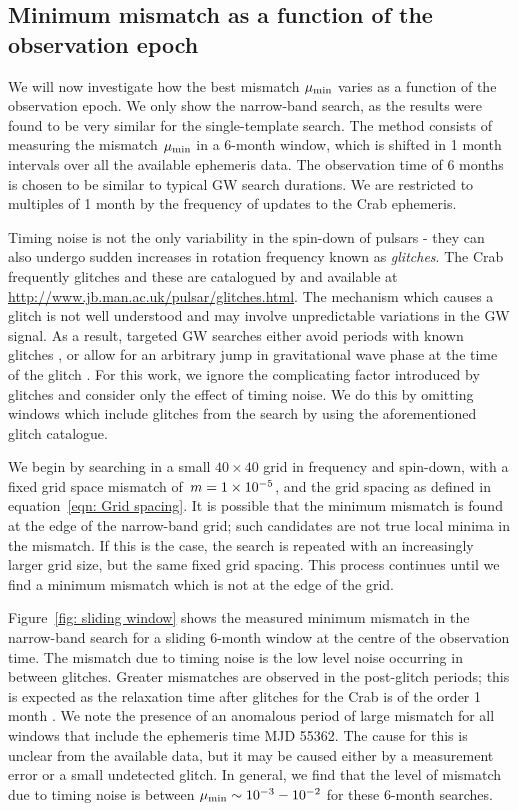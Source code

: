 \documentclass[../full_thesis/full_thesis.tex]{subfiles}
\begin{document}
\subsection{Minimum mismatch as a function of the observation epoch}
\label{sec: Minimum mismatch as a function of the observation epoch}

We will now investigate how the best mismatch $\mu_{\mathrm{min}}$ varies as a function of
the observation epoch. We only show the narrow-band search, as the results were
found to be very similar for the single-template search. The method consists of
measuring the mismatch $\mu_{\mathrm{min}}$ in a 6-month window, which is shifted in 1
month intervals over all the available ephemeris data. The observation time of
6 months is chosen to be similar to typical GW search durations. We are
restricted to multiples of 1 month by the frequency of updates to the Crab
ephemeris.

Timing noise is not the only variability in the spin-down of pulsars - they can
also undergo sudden increases in rotation frequency known as \emph{glitches}.
The Crab frequently glitches and these are catalogued by \citet{Espinoza2011}
and available at \url{http://www.jb.man.ac.uk/pulsar/glitches.html}.
The mechanism which causes a glitch is not well understood and may involve
unpredictable variations in the GW signal. As a result, targeted GW searches
either avoid periods with known glitches \citep{ligo2008}, or
allow for an arbitrary jump in gravitational wave phase at the time of
the glitch \citep{ligo2010}. For this work, we ignore
the complicating factor introduced by glitches and consider
only the effect of timing noise. We do this by
omitting windows which include glitches from the search by using
the aforementioned glitch catalogue.

We begin by searching in a small
$40\times40$ grid in frequency and spin-down, with a fixed grid space
mismatch of~$m=1\times10^{-5}$, and the grid spacing as defined in
equation~\eqref{eqn: Grid spacing}. It is possible that the minimum mismatch is
found at the edge of the narrow-band grid; such candidates  are not true local
minima in the mismatch. If this is the case, the search is repeated with an
increasingly larger grid size, but the same fixed grid spacing.  This process
continues until we find a minimum mismatch which is not at the edge of the
grid.

Figure~\ref{fig: sliding window} shows the measured minimum mismatch in the
narrow-band search for a sliding 6-month window at the centre of the
observation time. The mismatch due to timing noise is the low level noise
occurring in between glitches. Greater mismatches are observed in the
post-glitch periods; this is expected as the relaxation time after glitches for
the Crab is of the order 1 month \citep{Lyne2012book}.  We note the presence of
an anomalous period of large mismatch for all  windows that include the
ephemeris time MJD 55362. The cause for this is unclear from the available
data, but it may be caused either by a measurement error or a small undetected
glitch. In general, we find that the level of mismatch due to timing noise is
between $\mu_{\mathrm{min}} \sim 10^{-3} - 10^{-2}$ for these 6-month searches.
\end{document}
